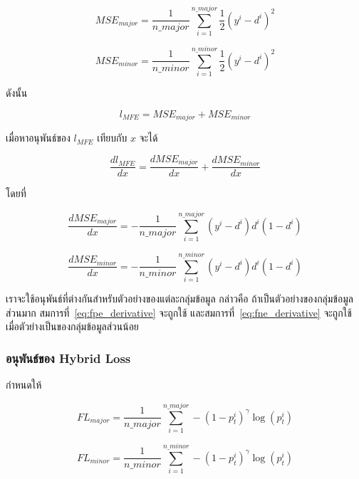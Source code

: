 \begin{equation}
MSE_{major} = \frac{1}{n\_major}\sum_{i=1}^{n\_major}\frac{1}{2}(y^{i} - d^{i})^{2}
\end{equation}

\begin{equation}
MSE_{minor} = \frac{1}{n\_minor}\sum_{i=1}^{n\_minor}\frac{1}{2}(y^{i} - d^{i})^{2}
\end{equation}

ดังนั้น

\begin{equation}
    l_{MFE} = MSE_{major} + MSE_{minor}
\end{equation}

เมื่อหาอนุพันธ์ของ $l_{MFE}$ เทียบกับ $x$ จะได้

\begin{equation}
\frac{dl_{MFE}}{dx} = \frac{dMSE_{major}}{dx} + \frac{dMSE_{minor}}{dx}
\end{equation}

โดยที่

\begin{equation} \label{eq:fpe_derivative}
\frac{dMSE_{major}}{dx} = - \frac{1}{n\_major} \sum_{i=1}^{n\_major} (y^{i} - d^{i}) d^{i} (1 - d^{i})
\end{equation}

\begin{equation} \label{eq:fne_derivative}
\frac{dMSE_{minor}}{dx} = - \frac{1}{n\_minor} \sum_{i=1}^{n\_minor} (y^{i} - d^{i}) d^{i} (1 - d^{i})
\end{equation}

เราจะใช้อนุพันธ์ที่ต่างกันสำหรับตัวอย่างของแต่ละกลุ่มข้อมูล กล่าวคือ ถ้าเป็นตัวอย่างของกลุ่มข้อมูลส่วนมาก สมการที่~\ref{eq:fpe_derivative} จะถูกใช้ และสมการที่~\ref{eq:fne_derivative} จะถูกใช้เมื่อตัวย่างเป็นของกลุ่มข้อมูลส่วนน้อย



\subsubsection{อนุพันธ์ของ Hybrid Loss}
กำหนดให้

\begin{equation}
    FL_{major} = \frac{1}{n\_major} \sum_{i = 1}^{n\_major} - (1 - p_{t}^{i})^{\gamma}\log (p_{t}^{i})
\end{equation}

\begin{equation}
    FL_{minor} = \frac{1}{n\_minor} \sum_{i = 1}^{n\_minor} - (1 - p_{t}^{i})^{\gamma}\log (p_{t}^{i})
\end{equation}

